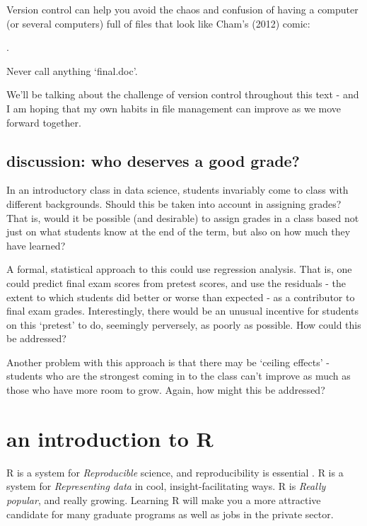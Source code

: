 \documentclass[openany]{book}
\begin{document}
Version control can help you avoid the chaos and confusion of having a computer (or several computers) full of files that look like Cham's (2012) comic:

.

Never call anything `final.doc'.

We'll be talking about the challenge of version control throughout this text - and I am hoping that my own habits in file management can improve as we move forward together.

\hypertarget{discussion-who-deserves-a-good-grade}{%
\section{discussion: who deserves a good grade?}\label{discussion-who-deserves-a-good-grade}}

In an introductory class in data science, students invariably come to class with different backgrounds. Should this be taken into account in assigning grades? That is, would it be possible (and desirable) to assign grades in a class based not just on what students know at the end of the term, but also on how much they have learned?

A formal, statistical approach to this could use regression analysis. That is, one could predict final exam scores from pretest scores, and use the residuals - the extent to which students did better or worse than expected - as a contributor to final exam grades. Interestingly, there would be an unusual incentive for students on this `pretest' to do, seemingly perversely, as poorly as possible. How could this be addressed?

Another problem with this approach is that there may be `ceiling effects' - students who are the strongest coming in to the class can't improve as much as those who have more room to grow. Again, how might this be addressed?

\hypertarget{an-introduction-to-r}{%
\chapter{an introduction to R}\label{an-introduction-to-r}}

R is a system for \emph{Reproducible} science, and reproducibility is essential \citep{baumer2014r}. R is a system for \emph{Representing data} in cool, insight-facilitating ways. R is \emph{Really popular}, and really growing. Learning R will make you a more attractive candidate for many graduate programs as well as jobs in the private sector.
\end{document}
